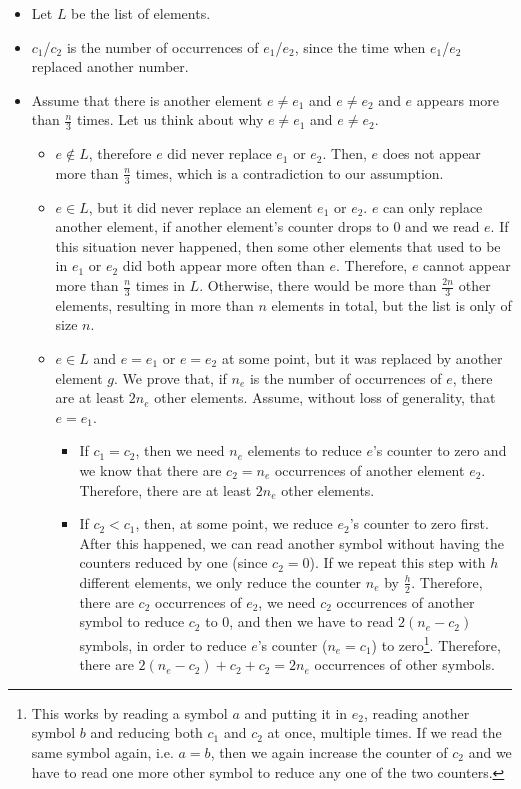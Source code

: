 \documentclass[12pt]{article}
\begin{document}
\begin{itemize}
	\item Let $L$ be the list of elements.
	\item $c_1$/$c_2$ is the number of occurrences of $e_1$/$e_2$, since the time when $e_1$/$e_2$ replaced another number.
	\item Assume that there is another element $e \not= e_1$ and $e \not= e_2$ and $e$ appears more than $\frac{n}{3}$ times. Let us think about why $e \not= e_1$ and $e \not= e_2$. 
	\begin{itemize}
		\item $e \not \in L$, therefore $e$ did never replace $e_1$ or $e_2$. Then, $e$ does not appear more than $\frac{n}{3}$ times, which is a contradiction to our assumption.
		\item $e \in L$, but it did never replace an element $e_1$ or $e_2$. $e$ can only replace another element, if another element's counter drops to 0 and we read $e$. If this situation never happened, then some other elements that used to be in $e_1$ or $e_2$ did both appear more often than $e$. Therefore, $e$ cannot appear more than $\frac{n}{3}$ times in $L$. Otherwise, there would be more than $\frac{2n}{3}$ other elements, resulting in more than $n$ elements in total, but the list is only of size $n$.
		\item $e \in L$ and $e=e_1$ or $e=e_2$ at some point, but it was replaced by another element $g$. We prove that, if $n_e$ is the number of occurrences of $e$, there are at least $2n_e$ other elements. Assume, without loss of generality, that $e=e_1$. 
		\begin{itemize}
			\item If $c_1=c_2$, then we need $n_e$ elements to reduce $e$'s counter to zero and we know that there are $c_2=n_e$ occurrences of another element $e_2$. Therefore, there are at least $2n_e$ other elements.
			\item If $c_2 < c_1$, then, at some point, we reduce $e_2$'s counter to zero first. After this happened, we can read another symbol without having the counters reduced by one (since $c_2 = 0$). If we repeat this step with $h$ different elements, we only reduce the counter $n_e$ by $\frac{h}{2}$. Therefore, there are $c_2$ occurrences of $e_2$, we need $c_2$ occurrences of another symbol to reduce $c_2$ to 0, and then we have to read $2(n_e - c_2)$ symbols, in order to reduce $e$'s counter ($n_e=c_1$) to zero\footnote{This works by reading a symbol $a$ and putting it in $e_2$, reading another symbol $b$ and reducing both $c_1$ and $c_2$ at once, multiple times. If we read the same symbol again, i.e. $a=b$, then we again increase the counter of $c_2$ and we have to read one more other symbol to reduce any one of the two counters.}. Therefore, there are $2(n_e-c_2) + c_2 + c_2=2n_e$ occurrences of other symbols.

\end{itemize}
\end{itemize}
\end{itemize}
\end{document}
